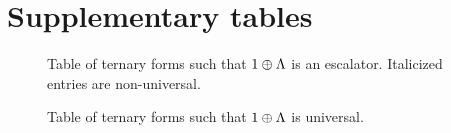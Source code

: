 \chapter*{Supplementary tables}
\label{appx:quaternary-escalators}


\begin{figure}
        
    \caption[
        Table of ternary forms such that \(1 \oplus \Lattice\) is an escalator.
    ]{Table of ternary forms such that \(1 \oplus \Lattice\) is an escalator. \cite[Table~3]{bhargava2000conway} Italicized entries are non-universal.}
    \label{fig:appx:ternary-escalators}
\end{figure}

\clearpage

\begin{figure}
    
    \caption[
        Table of ternary forms such that \(1 \oplus \Lattice\) is universal.
    ]{Table of ternary forms such that \(1 \oplus \Lattice\) is universal. \cite[Table~5]{bhargava2000conway}}
    \label{fig:appx:ternary-universals}
\end{figure}
